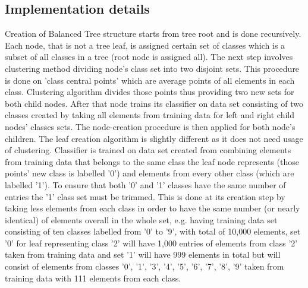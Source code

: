 \subsection{Implementation details}

Creation of Balanced Tree structure starts from tree root and is done recursively. Each node, that is not a tree leaf, is assigned certain set of classes which is a subset of all classes in a tree (root node is assigned all). The next step involves clustering method dividing node's class set into two disjoint sets. This procedure is done on 'class central points' which are average points of all elements in each class. Clustering algorithm divides those points thus providing two new sets for both child nodes. After that node trains its classifier on data set consisting of two classes created by taking all elements from training data for left and right child nodes' classes sets. The node-creation procedure is then applied for both node's children. The leaf creation algorithm is slightly different as it does not need usage of clustering. Classifier is trained on data set created from combining elements from training data that belongs to the same class the leaf node represents (those points' new class is labelled '0') and elements from every other class (which are labelled '1')\label{balanced_tree:one-vs-rest}. To ensure that both '0' and '1' classes have the same number of entries the '1' class set must be trimmed. This is done at its creation step by taking less elements from each class in order to have the same number (or nearly identical) of elements overall in the whole set, e.g. having training data set consisting of ten classes labelled from '0' to '9', with total of 10,000 elements, set '0' for leaf representing class '2' will have 1,000 entries of elements from class '2' taken from training data and set '1' will have 999 elements in total but will consist of elements from classes '0', '1', '3', '4', '5', '6', '7', '8', '9' taken from training data with 111 elements from each class.

